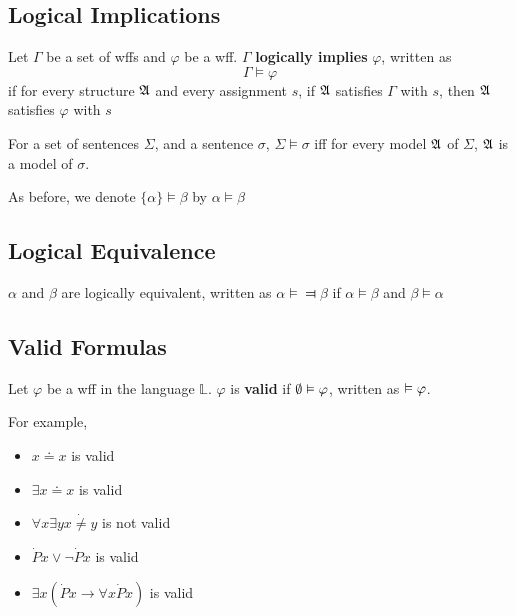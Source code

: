 \subsection{Logical Implications}

\begin{definition}
    Let $\Gamma$ be a set of wffs and $\varphi$ be a wff. $\Gamma$ \textbf{logically implies} $\varphi$, written as
    \[ \Gamma \vDash \varphi \]
    if for every structure $\mathfrak{A}$ and every assignment $s$, if $\mathfrak{A}$ satisfies $\Gamma$ with $s$, then $\mathfrak{A}$ satisfies $\varphi$ with $s$
\end{definition}

\begin{theorem}
    For a set of sentences $\Sigma$, and a sentence $\sigma$, $\Sigma\vDash\sigma$ iff for every model $\mathfrak{A}$ of $\Sigma$, $\mathfrak{A}$ is a model of $\sigma$.
\end{theorem}

As before, we denote $\{\alpha\}\vDash\beta$ by $\alpha\vDash\beta$

\subsection{Logical Equivalence}

\begin{definition}
    $\alpha$ and $\beta$ are logically equivalent, written as $\alpha\vDash\Dashv\beta$ if $\alpha\vDash\beta$ and $\beta\vDash\alpha$
\end{definition}

\subsection{Valid Formulas}

\begin{definition}
    Let $\varphi$ be a wff in the language $\mathbb{L}$. $\varphi$ is \textbf{valid} if $\emptyset\vDash{}\varphi$, written as $\vDash{}\varphi$.
\end{definition}

For example,

\begin{itemize}
    \item $x \doteq x$ is valid
    \item $\exists x \doteq x$ is valid
    \item $\forall x \exists y x\dot{\neq}y$ is not valid
    \item $\dot{P}x \vee \neg \dot{P}x$ is valid
    \item $\exists x(\dot{P}x \to \forall x \dot{P}x)$ is valid
\end{itemize}

